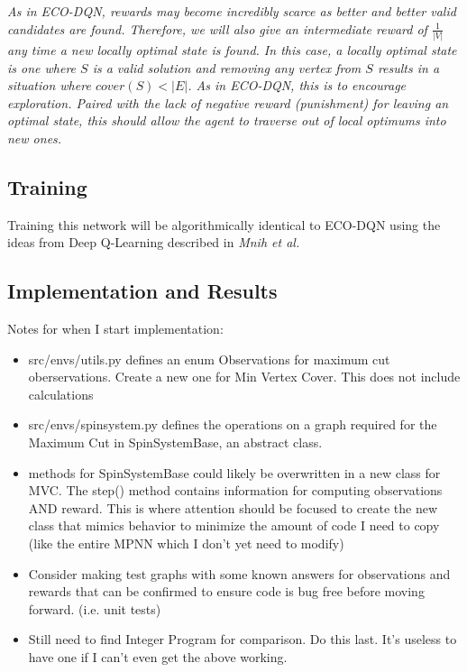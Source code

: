 \documentclass{article}
\begin{document}
\textit{As in ECO-DQN, rewards may become incredibly scarce as better and better valid candidates are found. Therefore, we will also give an intermediate reward of $\frac{1}{|V|}$ any time a new locally optimal state is found. In this case, a locally optimal state is one where $S$ is a valid solution and removing any vertex from $S$ results in a situation where $cover(S) < |E|$. As in ECO-DQN, this is to encourage exploration. Paired with the lack of negative reward (punishment) for leaving an optimal state, this should allow the agent to traverse out of local optimums into new ones.}

\subsection{Training}

Training this network will be algorithmically identical to ECO-DQN using the ideas from Deep Q-Learning described in \textit{Mnih et al.} \cite{deepmind_2015}

\subsection{Implementation and Results}

Notes for when I start implementation: 

\begin{itemize}
    \item src/envs/utils.py defines an enum Observations for maximum cut oberservations. Create a new one for Min Vertex Cover. This does not include calculations
    \item src/envs/spinsystem.py defines the operations on a graph required for the Maximum Cut in SpinSystemBase, an abstract class. 
    \item methods for SpinSystemBase could likely be overwritten in a new class for MVC. The step() method contains information for computing observations AND reward. This is where attention should be focused to create the new class that mimics behavior to minimize the amount of code I need to copy (like the entire MPNN which I don't yet need to modify)
    \item Consider making test graphs with some known answers for observations and rewards that can be confirmed to ensure code is bug free before moving forward. (i.e. unit tests)
    \item Still need to find Integer Program for comparison. Do this last. It's useless to have one if I can't even get the above working.
\end{itemize}
\end{document}
